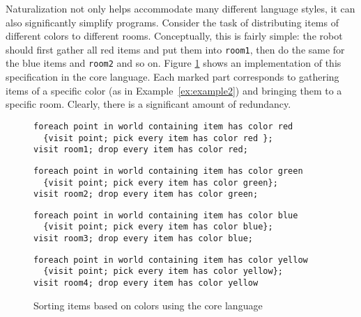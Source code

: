 \documentclass[letterpaper, 10 pt, conference]{ieeeconf}  %
\begin{document}
\begin{example}
\label{ex:definingAFunction}
Naturalization not only helps accommodate many different language styles, it can also significantly simplify programs.
Consider the task of distributing items of different colors to different rooms.
Conceptually, this is fairly simple: the robot should first gather all red items and put them into \lstinline{room1},
then do the same for the blue items and \lstinline{room2} and so on.
Figure \ref{fig:coreLanguageDefinitionOfSortingOnColors} shows an implementation of this specification in the core language.
Each marked part corresponds to gathering items of a specific color (as in Example~\ref{ex:example2}) and bringing
them to a specific room.
Clearly, there is a significant amount of redundancy.
\begin{figure}[t!]
  \begin{lstlisting}[frame=leftline,xleftmargin=15pt, xrightmargin=15pt]
foreach point in world containing item has color red
  {visit point; pick every item has color red };
visit room1; drop every item has color red;
  \end{lstlisting}

  \begin{lstlisting}[frame=leftline,xleftmargin=15pt, xrightmargin=15pt]
foreach point in world containing item has color green
  {visit point; pick every item has color green};
visit room2; drop every item has color green;
  \end{lstlisting}

  \begin{lstlisting}[frame=leftline,xleftmargin=15pt, xrightmargin=15pt]
foreach point in world containing item has color blue
  {visit point; pick every item has color blue};
visit room3; drop every item has color blue;
  \end{lstlisting}

  \begin{lstlisting}[frame=leftline,xleftmargin=15pt, xrightmargin=15pt]
foreach point in world containing item has color yellow
  {visit point; pick every item has color yellow};
visit room4; drop every item has color yellow
  \end{lstlisting}
\caption{Sorting items based on colors using the core language}
\label{fig:coreLanguageDefinitionOfSortingOnColors}
\end{figure}


\end{example}
\end{document}
